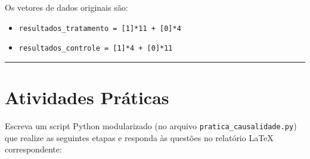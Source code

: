 \documentclass[12pt]{article}
\begin{document}
Os vetores de dados originais são:
\begin{itemize}
    \item \lstinline|resultados_tratamento = [1]*11 + [0]*4|
    \item \lstinline|resultados_controle = [1]*4 + [0]*11|
\end{itemize}

\vspace{0.3cm}
\hrule
\vspace{0.5cm}

\section*{Atividades Práticas}

Escreva um script Python modularizado (no arquivo \texttt{pratica\_causalidade.py}) que realize as seguintes etapas e responda às questões no relatório LaTeX correspondente:
\end{document}
